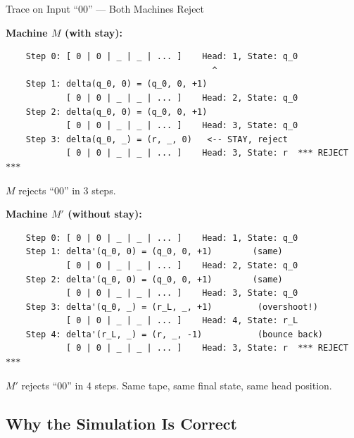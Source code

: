 \begin{examplebox}{Trace on Input ``00'' --- Both Machines Reject}

\textbf{Machine $M$ (with stay):}
\begin{lstlisting}
    Step 0: [ 0 | 0 | _ | _ | ... ]    Head: 1, State: q_0
                                         ^
    Step 1: delta(q_0, 0) = (q_0, 0, +1)
            [ 0 | 0 | _ | _ | ... ]    Head: 2, State: q_0
    Step 2: delta(q_0, 0) = (q_0, 0, +1)
            [ 0 | 0 | _ | _ | ... ]    Head: 3, State: q_0
    Step 3: delta(q_0, _) = (r, _, 0)   <-- STAY, reject
            [ 0 | 0 | _ | _ | ... ]    Head: 3, State: r  *** REJECT ***
\end{lstlisting}
$M$ rejects ``$00$'' in 3 steps.

\textbf{Machine $M'$ (without stay):}
\begin{lstlisting}
    Step 0: [ 0 | 0 | _ | _ | ... ]    Head: 1, State: q_0
    Step 1: delta'(q_0, 0) = (q_0, 0, +1)        (same)
            [ 0 | 0 | _ | _ | ... ]    Head: 2, State: q_0
    Step 2: delta'(q_0, 0) = (q_0, 0, +1)        (same)
            [ 0 | 0 | _ | _ | ... ]    Head: 3, State: q_0
    Step 3: delta'(q_0, _) = (r_L, _, +1)         (overshoot!)
            [ 0 | 0 | _ | _ | ... ]    Head: 4, State: r_L
    Step 4: delta'(r_L, _) = (r, _, -1)           (bounce back)
            [ 0 | 0 | _ | _ | ... ]    Head: 3, State: r  *** REJECT ***
\end{lstlisting}
$M'$ rejects ``$00$'' in 4 steps. Same tape, same final state, same head position.
\end{examplebox}


\subsection{Why the Simulation Is Correct}

